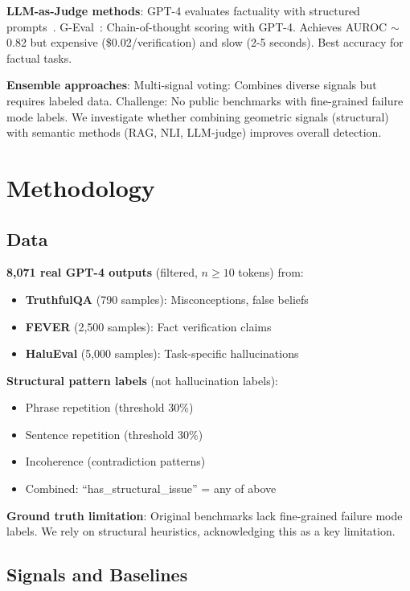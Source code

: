 \documentclass[11pt]{article}
\begin{document}
\textbf{LLM-as-Judge methods}:
GPT-4 evaluates factuality with structured prompts~\cite{zheng2023mtbench}. G-Eval~\cite{liu2023geval}: Chain-of-thought scoring with GPT-4. Achieves AUROC $\sim$0.82 but expensive (\$0.02/verification) and slow (2-5 seconds). Best accuracy for factual tasks.

\textbf{Ensemble approaches}:
Multi-signal voting: Combines diverse signals but requires labeled data. Challenge: No public benchmarks with fine-grained failure mode labels. We investigate whether combining geometric signals (structural) with semantic methods (RAG, NLI, LLM-judge) improves overall detection.

\section{Methodology}
\label{sec:methodology}

\subsection{Data}

\textbf{8,071 real GPT-4 outputs} (filtered, $n \geq 10$ tokens) from:
\begin{itemize}
\item \textbf{TruthfulQA} (790 samples): Misconceptions, false beliefs
\item \textbf{FEVER} (2,500 samples): Fact verification claims
\item \textbf{HaluEval} (5,000 samples): Task-specific hallucinations
\end{itemize}

\textbf{Structural pattern labels} (not hallucination labels):
\begin{itemize}
\item Phrase repetition (threshold 30\%)
\item Sentence repetition (threshold 30\%)
\item Incoherence (contradiction patterns)
\item Combined: ``has\_structural\_issue'' = any of above
\end{itemize}

\textbf{Ground truth limitation}: Original benchmarks lack fine-grained failure mode labels. We rely on structural heuristics, acknowledging this as a key limitation.

\subsection{Signals and Baselines}
\end{document}
